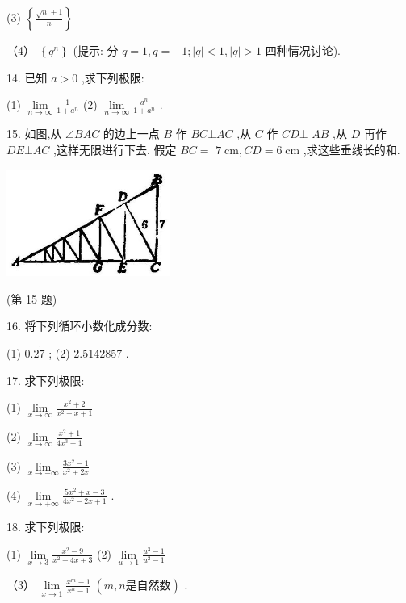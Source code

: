 \documentclass[10pt]{article}
\begin{document}
(3) \(\left\{ \frac{\sqrt{n} + 1}{n}\right\}\)

（4） \(\left\{ {q}^{n}\right\}\) (提示: 分 \(q = 1,q = - 1;\left| q\right| < 1,\left| q\right| > 1\) 四种情况讨论).

14. 已知 \(a > 0\) ,求下列极限:

(1) \(\mathop{\lim }\limits_{{n \rightarrow \infty }}\frac{1}{1 + {a}^{n}}\) (2) \(\mathop{\lim }\limits_{{n \rightarrow \infty }}\frac{{a}^{n}}{1 + {a}^{n}}\) .

15. 如图,从 \(\angle {BAC}\) 的边上一点 \(B\) 作 \({BC} \bot {AC}\) ,从 \(C\) 作 \({CD} \bot\) \({AB}\) ,从 \(D\) 再作 \({DE} \bot {AC}\) ,这样无限进行下去. 假定 \({BC} =\) \(7\mathrm{\;{cm}},{CD} = 6\mathrm{\;{cm}}\) ,求这些垂线长的和.

\begin{center}
\includegraphics[max width=0.4\textwidth]{images/01912c18-5c3f-733d-b775-749ba9897a9d_52_461588.jpg}
\end{center}

(第 15 题)

16. 将下列循环小数化成分数:

(1) \({0.2}\dot{7}\) ; (2) 2.5142857 .

17. 求下列极限:

(1) \(\mathop{\lim }\limits_{{x \rightarrow \infty }}\frac{{x}^{2} + 2}{{x}^{2} + x + 1}\)

(2) \(\mathop{\lim }\limits_{{x \rightarrow \infty }}\frac{{x}^{2} + 1}{4{x}^{3} - 1}\)

(3) \(\mathop{\lim }\limits_{{x \rightarrow - \infty }}\frac{3{x}^{2} - 1}{{x}^{2} + {2x}}\)

(4) \(\mathop{\lim }\limits_{{x \rightarrow + \infty }}\frac{5{x}^{2} + x - 3}{4{x}^{2} - {2x} + 1}\) .

18. 求下列极限:

(1) \(\mathop{\lim }\limits_{{x \rightarrow 3}}\frac{{x}^{2} - 9}{{x}^{2} - {4x} + 3}\) (2) \(\mathop{\lim }\limits_{{u \rightarrow 1}}\frac{{u}^{3} - 1}{{u}^{2} - 1}\)

（3） \(\mathop{\lim }\limits_{{x \rightarrow 1}}\frac{{x}^{m} - 1}{{x}^{n} - 1}\;\left( {m,n\text{是自然数}}\right)\) .
\end{document}
